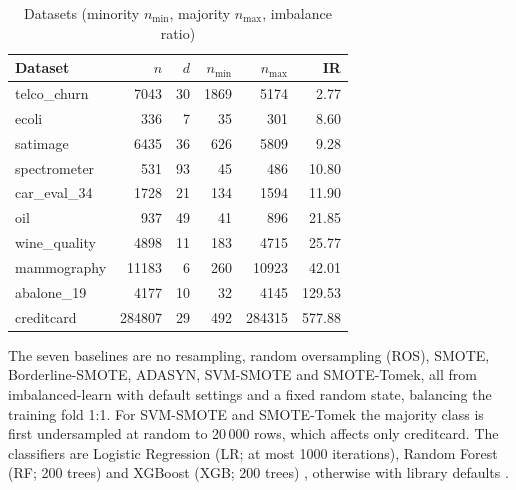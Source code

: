 \documentclass[conference,a4paper]{IEEEtran}
\begin{document}
\begin{table}[t]
\caption{Datasets (minority $n_{\min}$, majority $n_{\max}$, imbalance ratio)}\label{tab:data}
\centering\footnotesize
\setlength{\tabcolsep}{4pt}
\begin{tabular}{@{}lrrrrr@{}}
\toprule
Dataset & $n$ & $d$ & $n_{\min}$ & $n_{\max}$ & IR \\
\midrule
telco\_churn & 7043 & 30 & 1869 & 5174 & 2.77 \\
ecoli & 336 & 7 & 35 & 301 & 8.60 \\
satimage & 6435 & 36 & 626 & 5809 & 9.28 \\
spectrometer & 531 & 93 & 45 & 486 & 10.80 \\
car\_eval\_34 & 1728 & 21 & 134 & 1594 & 11.90 \\
oil & 937 & 49 & 41 & 896 & 21.85 \\
wine\_quality & 4898 & 11 & 183 & 4715 & 25.77 \\
mammography & 11183 & 6 & 260 & 10923 & 42.01 \\
abalone\_19 & 4177 & 10 & 32 & 4145 & 129.53 \\
creditcard & 284807 & 29 & 492 & 284315 & 577.88 \\
\bottomrule
\end{tabular}
\end{table}

The seven baselines are no resampling, random oversampling (ROS), SMOTE, Borderline-SMOTE, ADASYN, SVM-SMOTE and SMOTE-Tomek, all from imbalanced-learn with default settings and a fixed random state, balancing the training fold 1:1. For SVM-SMOTE and SMOTE-Tomek the majority class is first undersampled at random to 20\,000 rows, which affects only creditcard. The classifiers are Logistic Regression (LR; at most 1000 iterations), Random Forest (RF; 200 trees) \cite{breiman2001random} and XGBoost (XGB; 200 trees) \cite{chen2016xgboost}, otherwise with library defaults \cite{pedregosa2011scikit}.
\end{document}
